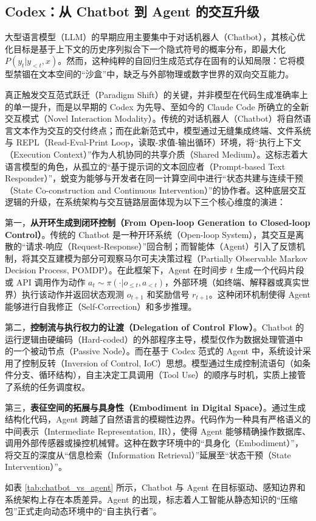 \subsection{Codex：从 Chatbot 到 Agent 的交互升级}

大型语言模型（LLM）的早期应用主要集中于对话机器人（Chatbot），其核心优化目标是基于上下文的历史序列拟合下一个隐式符号的概率分布，即最大化 $P(y_t | y_{<t}, x)$。然而，这种纯粹的自回归生成范式存在固有的认知局限：它将模型禁锢在文本空间的“沙盒”中，缺乏与外部物理或数字世界的双向交互能力。

真正触发交互范式跃迁（Paradigm Shift）的关键，并非模型在代码生成准确率上的单一提升，而是以早期的 Codex 为先导、至如今的 Claude Code 所确立的全新交互模式（Novel Interaction Modality）。传统的对话机器人（Chatbot）将自然语言文本作为交互的交付终点；而在此新范式中，模型通过无缝集成终端、文件系统与 REPL（Read-Eval-Print Loop，读取-求值-输出循环）环境，将“执行上下文（Execution Context）”作为人机协同的共享介质（Shared Medium）。这标志着大语言模型的角色，从孤立的“基于提示词的文本回应者（Prompt-based Text Responder）”，蜕变为能够与开发者在同一计算空间中进行“状态共建与连续干预（State Co-construction and Continuous Intervention）”的协作者。这种底层交互逻辑的升级，在系统架构与交互链路层面体现为以下三个核心维度的演进：

第一，\textbf{从开环生成到闭环控制（From Open-loop Generation to Closed-loop Control）}。传统的 Chatbot 是一种开环系统（Open-loop System），其交互是离散的“请求-响应（Request-Response）”回合制；而智能体（Agent）引入了反馈机制，将其交互建模为部分可观察马尔可夫决策过程（Partially Observable Markov Decision Process, POMDP）。在此框架下，Agent 在时间步 $t$ 生成一个代码片段或 API 调用作为动作 $a_t \sim \pi(\cdot | o_{\le t}, a_{<t})$，外部环境（如终端、解释器或真实世界）执行该动作并返回状态观测 $o_{t+1}$ 和奖励信号 $r_{t+1}$。这种闭环机制使得 Agent 能够进行自我修正（Self-Correction）和多步推理。

第二，\textbf{控制流与执行权力的让渡（Delegation of Control Flow）}。Chatbot 的运行逻辑由硬编码（Hard-coded）的外部程序主导，模型仅作为数据处理管道中的一个被动节点（Passive Node）。而在基于 Codex 范式的 Agent 中，系统设计采用了控制反转（Inversion of Control, IoC）思想。模型通过生成控制流语句（如条件分支、循环结构），自主决定工具调用（Tool Use）的顺序与时机，实质上接管了系统的任务调度权。

第三，\textbf{表征空间的拓展与具身性（Embodiment in Digital Space）}。通过生成结构化代码，Agent 跨越了自然语言的模糊性边界。代码作为一种具有严格语义的中间表示（Intermediate Representation, IR），使得 Agent 能够精确操作数据库、调用外部传感器或操控机械臂。这种在数字环境中的“具身化（Embodiment）”，将交互的深度从“信息检索（Information Retrieval）”延展至“状态干预（State Intervention）”。

如表 \ref{tab:chatbot_vs_agent} 所示，Chatbot 与 Agent 在目标驱动、感知边界和系统架构上存在本质差异。Agent 的出现，标志着人工智能从静态知识的“压缩包”正式走向动态环境中的“自主执行者”。


